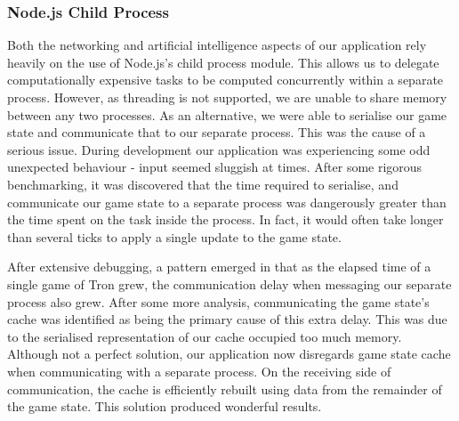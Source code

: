 \documentclass{standalone}
\begin{document}
			\subsubsection{Node.js Child Process}
				Both the networking and artificial intelligence aspects of our application rely heavily on the use of Node.js's child process module. This allows us to delegate computationally expensive tasks to be computed concurrently within a separate process. However, as threading is not supported, we are unable to share memory between any two processes. As an alternative, we were able to serialise our game state and communicate that to our separate process. This was the cause of a serious issue. During development our application was experiencing some odd unexpected behaviour - input seemed sluggish at times. After some rigorous benchmarking, it was discovered that the time required to serialise, and communicate our game state to a separate process was dangerously greater than the time spent on the task inside the process. In fact, it would often take longer than several ticks to apply a single update to the game state.

				After extensive debugging, a pattern emerged in that as the elapsed time of a single game of Tron grew, the communication delay when messaging our separate process also grew. After some more analysis, communicating the game state's cache was identified as being the primary cause of this extra delay. This was due to the serialised representation of our cache occupied too much memory. Although not a perfect solution, our application now disregards game state cache when communicating with a separate process. On the receiving side of communication, the cache is efficiently rebuilt using data from the remainder of the game state. This solution produced wonderful results.
\end{document}
